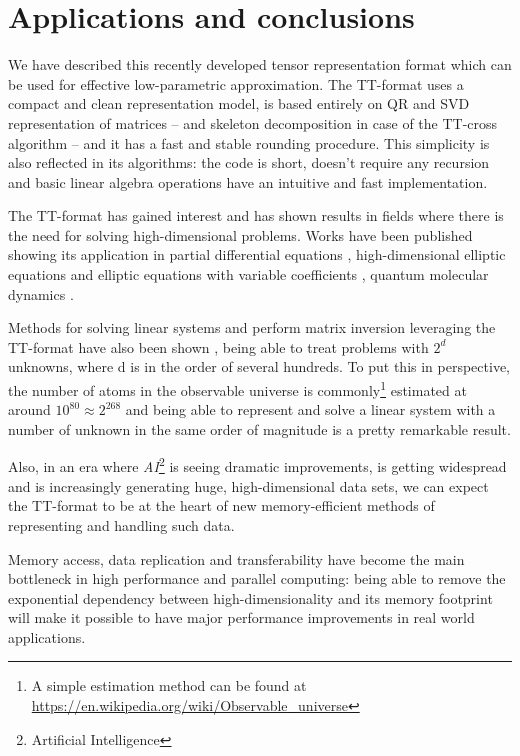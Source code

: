 \chapter{Applications and conclusions}
We have described this recently developed tensor representation format which can be used for effective low-parametric approximation.
The TT-format uses a compact and clean representation model, is based entirely on QR and SVD representation of matrices -- and skeleton decomposition in case of the TT-cross algorithm -- and it has a fast and stable rounding procedure.
This simplicity is also reflected in its algorithms: the code is short, doesn't require any recursion and basic linear algebra operations have an intuitive and fast implementation.

The TT-format has gained interest and has shown results in fields where there is the need for solving high-dimensional problems. Works have been published showing its application in partial differential equations \cite{khoromskij2011qtt}, high-dimensional elliptic equations and elliptic equations with variable coefficients \cite{dolgov2010tensor}, quantum molecular dynamics \cite{khoromskij2010dmrg+}.

Methods for solving linear systems and perform matrix inversion leveraging the TT-format have also been shown \cite{oseledets2012solution}, being able to treat problems with $2^d$ unknowns, where d is in the order of several hundreds. To put this in perspective, the number of atoms in the observable universe is commonly\footnote{A simple estimation method can be found at \href{https://en.wikipedia.org/wiki/Observable_universe}{https://en.wikipedia.org/wiki/Observable\_universe}} estimated at around $10^{80} \approx 2^{268}$ and being able to represent and solve a linear system with a number of unknown in the same order of magnitude is a pretty remarkable result.

Also, in an era where \emph{AI}\footnote{Artificial Intelligence} is seeing dramatic improvements, is getting widespread and is increasingly generating huge, high-dimensional data sets, we can expect the TT-format to be at the heart of new memory-efficient methods of representing and handling such data.

Memory access, data replication and transferability have become the main bottleneck in high performance and parallel computing: being able to remove the exponential dependency between high-dimensionality and its memory footprint will make it possible to have major performance improvements in real world applications.

